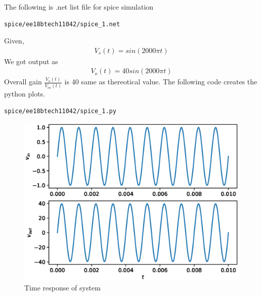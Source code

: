 \begin{enumerate}[label=\thesubsection.\arabic*.,ref=\thesubsection.\theenumi]
 The following is .net list file for spice simulation
 
\begin{lstlisting}
spice/ee18btech11042/spice_1.net
\end{lstlisting}
Given,
\begin{align}
    V_s (t)= sin(2000\pi t)
    \label{eq:ee18btech11042_14}
\end{align}
We got output as
\begin{align}
    V_o(t) = 40 sin(2000\pi t)
    \label{eq:ee18btech11042_15}
\end{align}
Overall gain  $\frac{V_o(t)}{V_{in}(t)}$ is 40 same as thereotical value.
\newline
The following code creates the python plots.
\begin{lstlisting}
spice/ee18btech11042/spice_1.py
\end{lstlisting}

\begin{figure}[!ht]
    
    \includegraphics[width = \columnwidth]{./spice/ee18btech11042/spice.eps}
    \caption{Time response of system}
    \label{fig:ee18btech11042_4}
\end{figure}





\end{enumerate}



